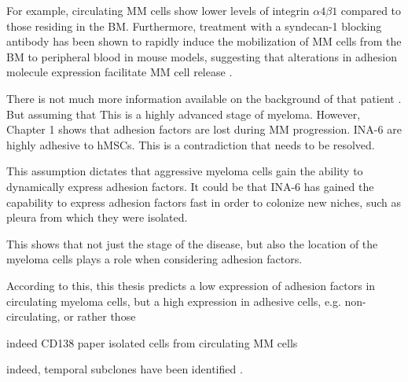 For example,
circulating MM cells show lower levels of integrin $\alpha4\beta1$
compared to those residing in the BM. Furthermore, treatment with a syndecan-1 blocking antibody
has been shown to rapidly induce the mobilization of MM cells from the BM to
peripheral blood in mouse models, suggesting that alterations in adhesion
molecule expression facilitate MM cell release
\cite{zeissigTumourDisseminationMultiple2020}.



There is not much more information available on the background of that patient \cite{TwoNewInterleukin6,burgerGp130RasMediated2001}.
But assuming that
This is a highly advanced
stage of myeloma.
However,  Chapter 1 shows that adhesion factors are
lost during MM progression. INA-6 are highly adhesive to hMSCs.
This is a contradiction that needs to be resolved.






This assumption dictates that aggressive myeloma cells gain the ability
to dynamically express adhesion factors.
It could be that INA-6 has gained the capability to express adhesion factors
fast in order to colonize new niches, such as pleura from which they were
isolated.

This shows that not just the stage of the disease, but also the location of the
myeloma cells plays a role when considering adhesion factors.

According to this, this thesis
predicts a low expression of adhesion factors in circulating myeloma cells,
but a high expression in adhesive cells, e.g. non-circulating, or rather those

indeed CD138 paper isolated cells from circulating MM cells \cite{akhmetzyanovaDynamicCD138Surface2020}

indeed, temporal subclones have been identified \cite{keatsClonalCompetitionAlternating2012}.

%
\label{sec:discussion_subsets_adhesion_factors}%

